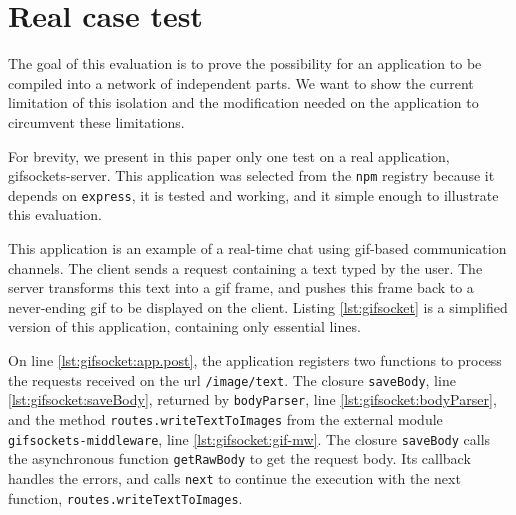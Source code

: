 \section{Real case test} \label{section:evaluation}

The goal of this evaluation is to prove the possibility for an application to be compiled into a network of independent parts.
We want to show the current limitation of this isolation and the modification needed on the application to circumvent these limitations.

For brevity, we present in this paper only one test on a real application, gifsockets-server.
This application was selected from the \texttt{npm} registry because it depends on \texttt{express}, it is tested and working, and it simple enough to illustrate this evaluation.

This application is an example of a real-time chat using gif-based communication channels.
The client sends a request containing a text typed by the user.
The server transforms this text into a gif frame, and pushes this frame back to a never-ending gif to be displayed on the client.
Listing \ref{lst:gifsocket} is a simplified version of this application, containing only essential lines.

On line \ref{lst:gifsocket:app.post}, the application registers two functions to process the requests received on the url \texttt{/image/text}.
The closure \texttt{saveBody}, line \ref{lst:gifsocket:saveBody}, returned by \texttt{bodyParser}, line \ref{lst:gifsocket:bodyParser}, and the method \texttt{routes.write\-Text\-To\-Images} from the external module \texttt{gifsockets-middleware}, line \ref{lst:gifsocket:gif-mw}.
The closure \texttt{saveBody} calls the asynchronous function \texttt{getRawBody} to get the request body.
Its callback handles the errors, and calls \texttt{next} to continue the execution with the next function, \texttt{routes.write\-Text\-To\-Images}.

